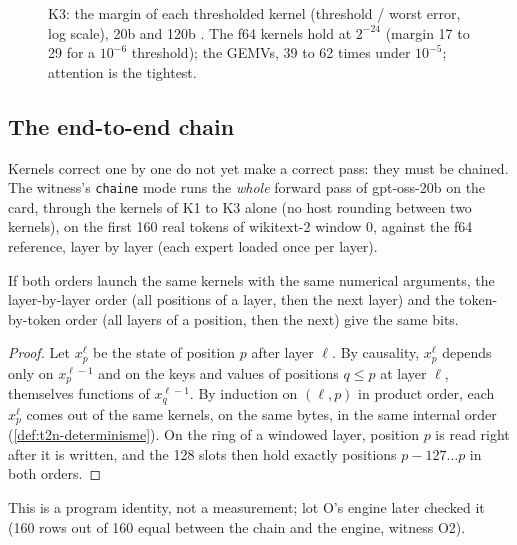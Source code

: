 \begin{figure}[!htbp]
\centering
\GrapheNoyMarges
\caption[K3: each kernel's margin to its threshold]{K3: the margin of each thresholded kernel (threshold / worst error, log scale), 20b and 120b \mes. The f64 kernels hold at $2^{-24}$ (margin 17 to 29 for a $10^{-6}$ threshold); the GEMVs, 39 to 62 times under $10^{-5}$; attention is the tightest.}
\label{fig:t2n-marges}
\end{figure}

\subsection{The end-to-end chain}

Kernels correct one by one do not yet make a correct pass: they must be chained. The witness's \texttt{chaine} mode runs the \emph{whole} forward pass of gpt-oss-20b on the card, through the kernels of K1 to K3 alone (no host rounding between two kernels), on the first 160 real tokens of wikitext-2 window 0, against the f64 reference, layer by layer (each expert loaded once per layer).

\begin{proposition}[Layer-by-layer order = token-by-token order]\label{prop:t2n-ordre}
If both orders launch the same kernels with the same numerical arguments, the layer-by-layer order (all positions of a layer, then the next layer) and the token-by-token order (all layers of a position, then the next) give the same bits.
\end{proposition}

\begin{proof}
Let $x_p^\ell$ be the state of position $p$ after layer $\ell$. By causality, $x_p^\ell$ depends only on $x_p^{\ell-1}$ and on the keys and values of positions $q \le p$ at layer $\ell$, themselves functions of $x_q^{\ell-1}$. By induction on $(\ell, p)$ in product order, each $x_p^\ell$ comes out of the same kernels, on the same bytes, in the same internal order (\cref{def:t2n-determinisme}). On the ring of a windowed layer, position $p$ is read right after it is written, and the 128 slots then hold exactly positions $p - 127 \ldots p$ in both orders.
\end{proof}

This is a program identity, not a measurement; lot O's engine later checked it (160 rows out of 160 equal between the chain and the engine, witness O2).

